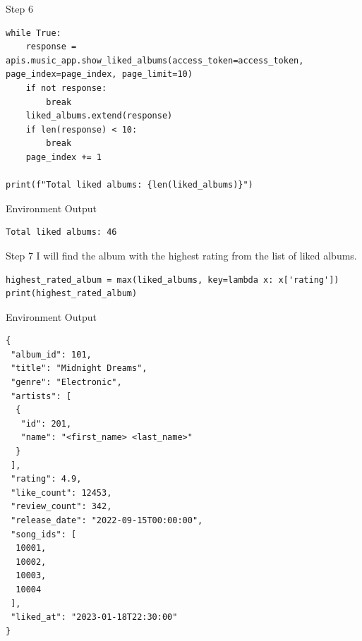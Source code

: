 \begin{center}
\begin{agentbox}{Step 6}
\begin{Verbatim}[fontsize=\scriptsize, breaklines, breakanywhere]
while True:
    response = apis.music_app.show_liked_albums(access_token=access_token, page_index=page_index, page_limit=10)
    if not response:
        break
    liked_albums.extend(response)
    if len(response) < 10:
        break
    page_index += 1

print(f"Total liked albums: {len(liked_albums)}")
\end{Verbatim}
\end{agentbox}
\begin{envbox}{Environment Output}
\begin{Verbatim}[fontsize=\scriptsize, breaklines, breakanywhere]
Total liked albums: 46

\end{Verbatim}
\end{envbox}

\begin{agentbox}{Step 7}
I will find the album with the highest rating from the list of liked albums.
\begin{Verbatim}[fontsize=\scriptsize, breaklines, breakanywhere]
highest_rated_album = max(liked_albums, key=lambda x: x['rating'])
print(highest_rated_album)
\end{Verbatim}
\end{agentbox}
\begin{envbox}{Environment Output}
\begin{Verbatim}[fontsize=\scriptsize, breaklines, breakanywhere]
{
 "album_id": 101,
 "title": "Midnight Dreams",
 "genre": "Electronic",
 "artists": [
  {
   "id": 201,
   "name": "<first_name> <last_name>"
  }
 ],
 "rating": 4.9,
 "like_count": 12453,
 "review_count": 342,
 "release_date": "2022-09-15T00:00:00",
 "song_ids": [
  10001,
  10002,
  10003,
  10004
 ],
 "liked_at": "2023-01-18T22:30:00"
}

\end{Verbatim}
\end{envbox}


\end{center}
